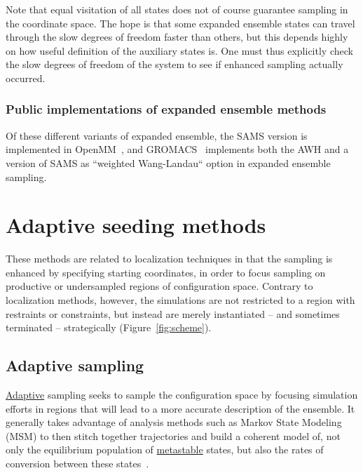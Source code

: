 \documentclass[9pt,review]{livecoms}
\begin{document}
Note that equal visitation of all states does not of course guarantee sampling in the coordinate space. The hope is that some expanded ensemble states can travel through the slow degrees of freedom faster than others, but this depends highly on how useful definition of the auxiliary states is. One must thus explicitly check the slow degrees of freedom of the system to see if enhanced sampling actually occurred. 

\subsubsection{Public implementations of expanded ensemble methods}

Of these different variants of expanded ensemble, the SAMS version is implemented in OpenMM~\cite{10.1371/journal.pcbi.1005659}, and GROMACS~\cite{lindahl_2021} implements both the AWH and a version of SAMS as ``weighted Wang-Landau`` option in expanded ensemble sampling.

\section{Adaptive seeding methods}
\label{sec:seeding}

These methods are related to localization techniques in that the sampling is enhanced by specifying starting coordinates, in order to focus sampling on productive or undersampled regions of configuration space. Contrary to localization methods, however, the simulations are not restricted to a region with restraints or constraints, but instead are merely instantiated -- and sometimes terminated -- strategically (Figure~\ref{fig:scheme}).


\subsection{Adaptive sampling}
\hyperlink{ref:Adaptive} {Adaptive} sampling seeks to sample the configuration space by focusing simulation efforts in regions that will lead to a more accurate description of the ensemble. It generally takes advantage of analysis methods such as Markov State Modeling (MSM) to then stitch together trajectories and build a coherent model of, not only the equilibrium population of \hyperlink{ref:metastab} {metastable} states, but also the rates of conversion between these states~\cite{10.1007/978-94-007-7606-7,10.1021/jacs.7b12191}.
\end{document}
